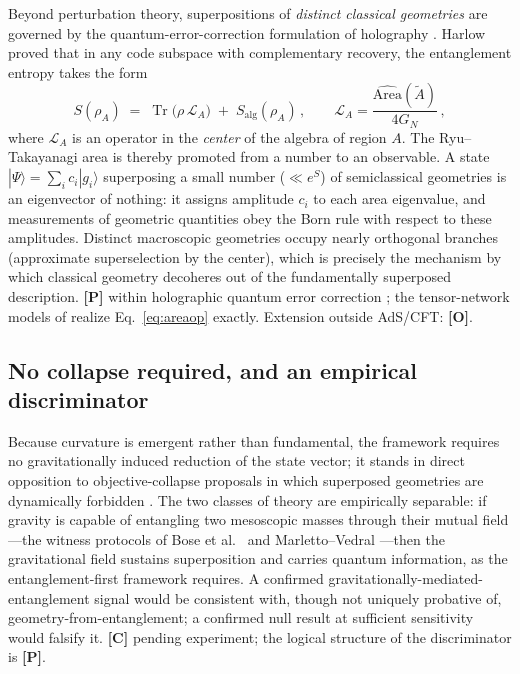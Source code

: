 \documentclass[11pt]{article}
\theoremstyle{definition}
\newcommand{\pP}{\textbf{[P]}}
\newcommand{\pC}{\textbf{[C]}}
\newcommand{\pO}{\textbf{[O]}}
\newcommand{\Tr}{\operatorname{Tr}}
\begin{document}
Beyond perturbation theory, superpositions of \emph{distinct classical
geometries} are governed by the quantum-error-correction formulation of
holography \cite{ADH2015,HaPPY2015}. Harlow \cite{Harlow2017} proved that in
any code subspace with complementary recovery, the entanglement entropy takes
the form
\begin{equation}
S(\rho_A)\;=\;\Tr\!\big(\rho\,\mathcal{L}_A\big)\;+\;S_{\mathrm{alg}}(\rho_A)\,,
\qquad
\mathcal{L}_A=\frac{\widehat{\mathrm{Area}}(\tilde A)}{4G_N}\,,
\label{eq:areaop}
\end{equation}
where $\mathcal{L}_A$ is an operator in the \emph{center} of the algebra of
region $A$. The Ryu--Takayanagi area is thereby promoted from a number to an
observable. A state $|\Psi\rangle=\sum_i c_i|g_i\rangle$ superposing a small
number ($\ll e^{S}$) of semiclassical geometries is an eigenvector of nothing:
it assigns amplitude $c_i$ to each area eigenvalue, and measurements of
geometric quantities obey the Born rule with respect to these amplitudes.
Distinct macroscopic geometries occupy nearly orthogonal branches
(approximate superselection by the center), which is precisely the mechanism
by which classical geometry decoheres out of the fundamentally superposed
description. \pP{} within holographic quantum error correction
\cite{ADH2015,Harlow2017}; the tensor-network models of \cite{HaPPY2015}
realize Eq.~\eqref{eq:areaop} exactly. Extension outside AdS/CFT: \pO{}.

\subsection{No collapse required, and an empirical discriminator}

Because curvature is emergent rather than fundamental, the framework requires
no gravitationally induced reduction of the state vector; it stands in direct
opposition to objective-collapse proposals in which superposed geometries are
dynamically forbidden \cite{Penrose1996}. The two classes of theory are
empirically separable: if gravity is capable of entangling two mesoscopic
masses through their mutual field---the witness protocols of Bose et al.\
\cite{Bose2017} and Marletto--Vedral \cite{MarlettoVedral2017}---then the
gravitational field sustains superposition and carries quantum information,
as the entanglement-first framework requires. A confirmed
gravitationally-mediated-entanglement signal would be consistent with, though
not uniquely probative of, geometry-from-entanglement; a confirmed null
result at sufficient sensitivity would falsify it. \pC{} pending experiment;
the logical structure of the discriminator is \pP{}.
\end{document}
